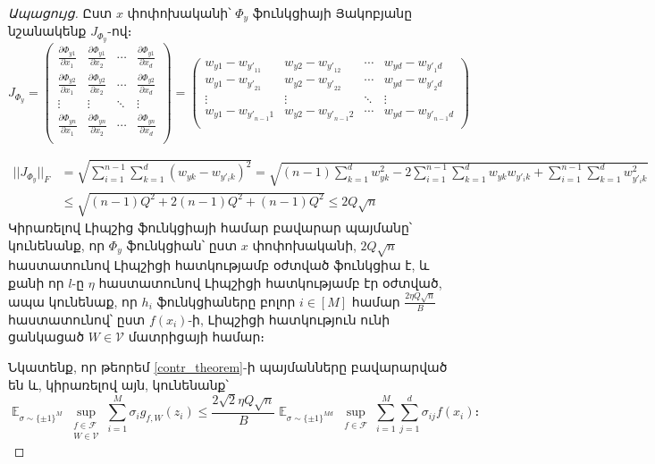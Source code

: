 \documentclass[12pt]{article}
\DeclareMathOperator*{\E}{\mathbb{E}}
\begin{document}
\begin{proof}[Ապացույց]
Ըստ $x$ փոփոխականի՝ $\Phi_y$  ֆունկցիայի Յակոբյանը նշանակենք $J_{\Phi_y} $-ով։
$$J_{\Phi_y}  = 
 \begin{pmatrix}
 \frac{\partial \Phi_{y1}}{\partial x_1} & \frac{\partial \Phi_{y1}}{\partial x_2} & \cdots & \frac{\partial \Phi_{y1}}{\partial x_d} \\
  \frac{\partial \Phi_{y2}}{\partial x_1} & \frac{\partial \Phi_{y2}}{\partial x_2} & \cdots & \frac{\partial \Phi_{y2}}{\partial x_d} \\
  \vdots  & \vdots  & \ddots & \vdots  \\
  \frac{\partial \Phi_{yn}}{\partial x_1} & \frac{\partial \Phi_{yn}}{\partial x_2} & \cdots & \frac{\partial \Phi_{yn}}{\partial x_d} \\
 \end{pmatrix} =
 \begin{pmatrix}
 w_{y1} - w_{{y'}_11} & w_{y2} - w_{{y'}_12} & \cdots & w_{yd} - w_{{y'}_1d} \\
   w_{y1} - w_{{y'}_21} & w_{y2} - w_{{y'}_22} & \cdots & w_{yd} - w_{{y'}_2d} \\
  \vdots  & \vdots  & \ddots & \vdots  \\
  w_{y1} - w_{{y'}_{n-1}1} & w_{y2} - w_{{y'}_{n-1}2} & \cdots & w_{yd} - w_{{y'}_{n-1}d} \\
 \end{pmatrix}
 $$

\begin{align*}
||J_{\Phi_y}||_F &= \sqrt{\sum_{i = 1}^{n-1} \sum_{k = 1}^d    \left(w_{yk} - w_{y'_ik}\right)^2} = \sqrt{(n-1)\sum_{k =1}^d w^2_{yk}   - 2 \sum_{i=1}^{n-1} \sum_{k=1}^d w_{yk} w_{y'_ik}  + \sum_{i=1}^{n-1} \sum_{k=1}^d  w^2_{y'_ik} } \\
&\leq  \sqrt{(n-1)Q^2+2(n-1)Q^2+(n-1)Q^2} \leq 2Q\sqrt{n}
\end{align*}
Կիրառելով Լիպշից ֆունկցիայի համար բավարար պայմանը՝ կունենանք, որ $\Phi_y$ ֆունկցիան՝  ըստ $x$ փոփոխականի, $2Q\sqrt{n}$ հաստատունով Լիպշիցի հատկությամբ օժտված ֆունկցիա է, և քանի որ $l$-ը $\eta$ հաստատունով Լիպշիցի հատկությամբ էր օժտված, ապա կունենաք, որ $h_i$ ֆունկցիաները բոլոր $i \in [M]$ համար $\frac{2 \eta Q\sqrt{n}}{B}$ հաստատունով՝ ըստ $f(x_i)$-ի, Լիպշիցի հատկություն ունի ցանկացած $W \in \mathcal{V}$ մատրիցայի համար։


Նկատենք,  որ թեորեմ  \ref{contr_theorem}-ի պայմանները բավարարված են և, կիրառելով այն, կունենանք՝
$$\E_{\sigma \sim \{\pm1\}^M} \sup_{\substack{ f  \in \mathcal{F}  \\ W \in \mathcal{V}}}\sum_{i=1}^M \sigma_ig_{f,W}(z_i) \leq  \frac{2\sqrt{2} \eta Q\sqrt{n}}{B}        \E_{\sigma \sim \{\pm1\}^{Md}} \sup_{\substack{ f  \in \mathcal{F}  }}\sum_{i=1}^M \sum_{j=1}^d \sigma_{ij}f(x_i)։$$



\end{proof}
\end{document}
